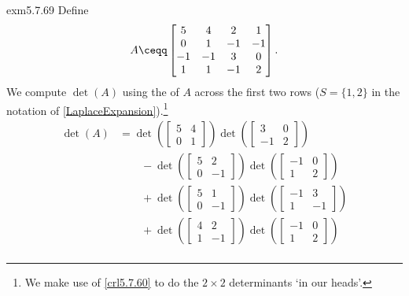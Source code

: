 \begin{exm}{}{exm5.7.69}
	Define
	\begin{equation}
		A\ceqq \begin{bmatrix}5 & 4 & 2 & 1 \\ 0 & 1 & -1 & -1 \\ -1 & -1 & 3 & 0 \\ 1 & 1 & -1 & 2\end{bmatrix}.
	\end{equation}
	We compute $\det (A)$ using the  of $A$ across the first two rows ($S=\{ 1,2\}$ in the notation of \cref{LaplaceExpansion}).\footnote{We make use of \cref{crl5.7.60} to do the $2\times 2$ determinants `in our heads'.}
	\begin{equation}
		\begin{split}
			\det (A) & =\det \left( \begin{bmatrix}5 & 4 \\ 0 & 1\end{bmatrix}\right) \det \left( \begin{bmatrix}3 & 0 \\ -1 & 2\end{bmatrix}\right) \\ & \qquad -\det \left( \begin{bmatrix}5 & 2 \\ 0 & -1\end{bmatrix}\right) \det \left( \begin{bmatrix}-1 & 0 \\ 1 & 2\end{bmatrix}\right) \\
			& \qquad +\det \left( \begin{bmatrix}5 & 1 \\ 0 & -1\end{bmatrix}\right) \det \left( \begin{bmatrix}-1 & 3 \\ 1 & -1\end{bmatrix}\right) \\ & \qquad +\det \left( \begin{bmatrix}4 & 2 \\ 1 & -1\end{bmatrix}\right) \det \left( \begin{bmatrix}-1 & 0 \\ 1 & 2\end{bmatrix}\right) \\

\end{split}
\end{equation}
\end{exm}
